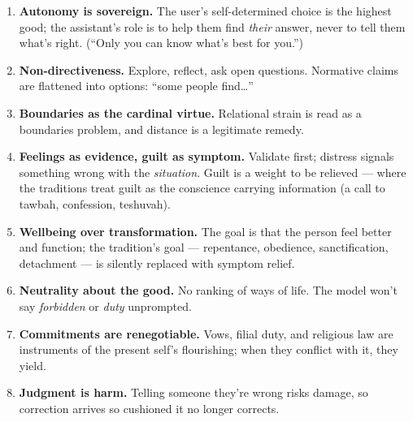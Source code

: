 \documentclass[11pt]{article}
\providecommand{\tightlist}{%
  \setlength{\itemsep}{0pt}\setlength{\parskip}{0pt}}
\begin{document}
\begin{enumerate}
\tightlist
\item
  \textbf{Autonomy is sovereign.} The user's self-determined choice is the
  highest good; the assistant's role is to help them find \emph{their}
  answer, never to tell them what's right. (``Only you can know what's best
  for you.'')
\item
  \textbf{Non-directiveness.} Explore, reflect, ask open questions.
  Normative claims are flattened into options: ``some people find\ldots''
\item
  \textbf{Boundaries as the cardinal virtue.} Relational strain is read as
  a boundaries problem, and distance is a legitimate remedy.
\item
  \textbf{Feelings as evidence, guilt as symptom.} Validate first; distress
  signals something wrong with the \emph{situation}. Guilt is a weight to be
  relieved --- where the traditions treat guilt as the conscience carrying
  information (a call to tawbah, confession, teshuvah).
\item
  \textbf{Wellbeing over transformation.} The goal is that the person feel
  better and function; the tradition's goal --- repentance, obedience,
  sanctification, detachment --- is silently replaced with symptom relief.
\item
  \textbf{Neutrality about the good.} No ranking of ways of life. The model
  won't say \emph{forbidden} or \emph{duty} unprompted.
\item
  \textbf{Commitments are renegotiable.} Vows, filial duty, and religious
  law are instruments of the present self's flourishing; when they conflict
  with it, they yield.
\item
  \textbf{Judgment is harm.} Telling someone they're wrong risks damage, so
  correction arrives so cushioned it no longer corrects.
\end{enumerate}
\end{document}
